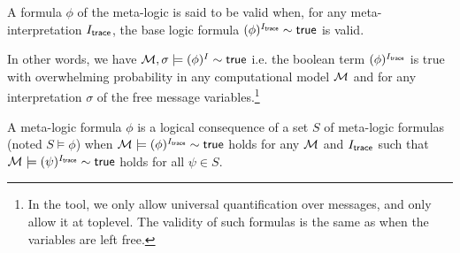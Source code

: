 \begin{definition}
  A formula $\phi$ of the meta-logic is said to be valid when,
  for any meta-interpretation $I_{\textsf{trace}}$, the base logic formula
  $(\phi)^{I_{\textsf{trace}}} \sim \mathsf{true}$ is valid.

  In other words, we have $\mathcal{M},\sigma\models(\phi)^I\sim\mathsf{true}$
  i.e. the boolean term $(\phi)^{I_{\textsf{trace}}}$ is true with overwhelming
  probability in any computational model $\mathcal{M}$ and for any interpretation
  $\sigma$ of the free message variables.\footnote{
  In the tool, we only allow universal quantification over messages, and
  only allow it at toplevel. The validity of such formulas is the same as
  when the variables are left free.}
\end{definition}


\begin{definition}
  A meta-logic formula $\phi$ is a
  logical consequence of a set $S$ of meta-logic formulas
  (noted $S \models \phi$)
  when
  $\mathcal{M}\models(\phi)^{I_{\textsf{trace}}}\sim\mathsf{true}$ holds for any $\mathcal{M}$ and ${I_{\textsf{trace}}}$ such that
  $\mathcal{M}\models(\psi)^{I_{\textsf{trace}}}\sim\mathsf{true}$ holds for all $\psi\in S$.
\end{definition}
